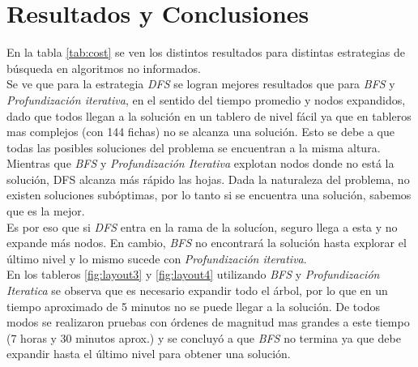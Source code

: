 \documentclass{sig-alternate}
\begin{document}
\section*{Resultados y Conclusiones}	
En la tabla \ref{tab:cost} se ven los distintos resultados para distintas estrategias de b\'usqueda	 en algoritmos no informados. \\
Se ve que para la estrategia \emph{DFS} se logran mejores resultados que para \emph{BFS} y \emph{Profundizaci\'on iterativa}, en el sentido del tiempo promedio y nodos expandidos, dado que todos llegan a la soluci\'on en un tablero de nivel f\'acil ya que en tableros mas complejos (con 144 fichas) no se alcanza una soluci\'on. Esto se debe a que todas las posibles soluciones del problema se encuentran a la misma altura. Mientras que \emph{BFS} y \emph{Profundizaci\'on Iterativa} explotan nodos donde no est\'a la soluci\'on, DFS alcanza m\'as r\'apido las hojas. Dada la naturaleza del problema, no existen soluciones sub\'optimas, por lo tanto si se encuentra una soluci\'on, sabemos que es la mejor.\\
 Es por eso que si \emph{DFS} entra en la rama de la soluc\'ion, seguro llega a esta y no expande m\'as nodos. En cambio, \emph{BFS} no encontrar\'a la soluci\'on hasta explorar el \'ultimo nivel y lo mismo sucede con \emph{Profundizaci\'on iterativa}. \\
En los tableros \ref{fig:layout3} y \ref{fig:layout4} utilizando \emph{BFS} y \emph{Profundizaci\'on Iteratica} se observa que es necesario expandir todo el \'arbol, por lo que en un tiempo aproximado de 5 minutos no se puede llegar a la soluci\'on. De todos modos se realizaron pruebas con \'ordenes de magnitud mas grandes a este tiempo (7 horas y 30 minutos aprox.) y se concluy\'o a que \emph{BFS} no termina ya que debe expandir hasta el \'ultimo nivel para obtener una soluci\'on.

\onecolumn
\end{document}
